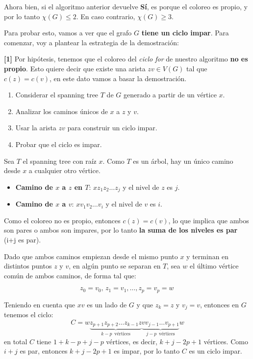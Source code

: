 \documentclass[a4paper]{article}
\begin{document}
Ahora bien, si el algoritmo anterior devuelve \textbf{Sí}, es porque el coloreo es propio, y por lo tanto $\chi(G) \leq 2$. En caso contrario, $\chi(G) \geq 3$.

Para probar esto, vamos a ver que el grafo $G$ \textbf{tiene un ciclo impar}. Para comenzar, voy a plantear la estrategia de la demostración:

\textbf{[1]} Por hipótesis, tenemos que el coloreo del \textit{ciclo for} de nuestro algoritmo \textbf{no es propio}. Esto quiere decir que existe una arista $zv \in V(G)$ tal que $c(z) = c(v)$, en este dato vamos a basar la demostración.

\begin{enumerate}
    \item Considerar el spanning tree $T$ de $G$ generado a partir de un vértice $x$.
    \item Analizar los caminos únicos de $x$ a $z$ y $v$.
    \item Usar la arista $zv$ para construir un ciclo impar.
    \item Probar que el ciclo es impar.
\end{enumerate}

Sea $T$ el spanning tree con raíz $x$. Como $T$ es un árbol, hay un único camino desde $x$ a cualquier otro vértice.
\begin{itemize}
    \item \textbf{Camino de $x$ a $z$ en $T$}: $xz_1z_2 \ldots z_j $ y el nivel de $z$ es $j$.
    \item \textbf{Camino de $x$ a $v$}: $xv_1v_2 \ldots v_i$ y el nivel de $v$ es $i$.
\end{itemize}

Como el coloreo no es propio, entonces $c(z) = c(v)$, lo que implica que ambos son pares o ambos son impares, por lo tanto \textbf{la suma de los niveles es par} (i+j es par). 

Dado que ambos caminos empiezan desde el mismo punto $x$ y terminan en distintos puntos $z$ y $v$, en algún punto se separan en $T$, sea $w$ el último vértice común de ambos caminos, de forma tal que:

\begin{equation*}
    z_0=v_0, \, z_1=v_1, \ldots, z_p=v_p = w \, 
\end{equation*}

Teniendo en cuenta que $xv$ es un lado de $G$ y que $z_k = z$ y $v_j = v$, entonces en $G$ tenemos el ciclo:
\begin{equation*}
    C = w\underbrace{z_{p+1}z_{p+2} \ldots z_{k-1}z}_{k-p \, \, \, \text{vértices}}\underbrace{vv_{j-1}\ldots v_{p+1}}_{j-p \, \, \, \text{vértices}} w
\end{equation*}
en total $C$ tiene $1+k-p+j-p$ vértices, es decir, $k+j-2p+1$ vértices. Como $i+j$ es par, entonces $k+j-2p+1$ es impar, por lo tanto $C$ es un ciclo impar.
\end{document}

